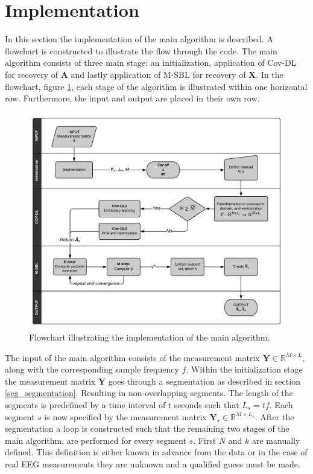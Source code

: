 \section{Implementation}\label{sec:implementation_flow}
In this section the implementation of the main algorithm is described.  A flowchart is constructed to illustrate the flow through the code.
The main algorithm consists of three main stage: an initialization, application of Cov-DL for recovery of $\mathbf{A}$ and lastly application of M-SBL for recovery of $\mathbf{X}$. 
In the flowchart, figure \ref{fig:flow}, each stage of the algorithm is illustrated within one horizontal row.
Furthermore, the input and output are placed in their own row.    
\begin{figure}[H]
\centering
\includegraphics[scale=0.7]{figures/ch_6/baseline_flowchart.png}
\caption{Flowchart illustrating the implementation of the main algorithm.}
\label{fig:flow}
\end{figure}
\noindent
The input of the main algorithm consists of the measurement matrix $\mathbf{Y} \in \mathbb{R}^{M \times L}$, along with the corresponding sample frequency $f$. 
Within the initialization stage the measurement matrix $\mathbf{Y}$ goes through a segmentation as described in section \ref{seg_segmentation}. 
Resulting in non-overlapping segments.
The length of the segments is predefined by a time interval of $t$ seconds such that $L_{s} = tf$. 
Each segment $s$ is now specified by the measurement matrix $\mathbf{Y}_s \in \mathbb{R}^{M \times L_{s}}$.
After the segmentation a loop is constructed such that the remaining two stages of the main algorithm, are performed for every segment $s$. 
First $N$ and $k$ are manually defined. 
This definition is either known in advance from the data or in the case of real EEG measurements they are unknown and a qualified guess must be made.

